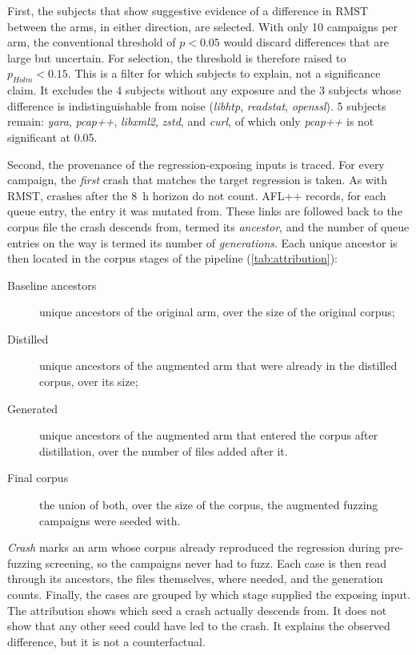 First, the subjects that show suggestive evidence of a difference in \ac{RMST} between the arms, in either direction, are selected.
With only \num{10} campaigns per arm, the conventional threshold of $p < \num{0.05}$ would discard differences that are large but uncertain.
For selection, the threshold is therefore raised to $p_{Holm} < \num{0.15}$.
This is a filter for which subjects to explain, not a significance claim.
It excludes the \num{4} subjects without any exposure and the \num{3} subjects whose difference is indistinguishable from noise (\emph{libhtp}, \emph{readstat}, \emph{openssl}).
\num{5} subjects remain: \emph{yara}, \emph{pcap++}, \emph{libxml2}, \emph{zstd}, and \emph{curl}, of which only \emph{pcap++} is not significant at \num{0.05}.

Second, the provenance of the regression-exposing inputs is traced.
For every campaign, the \emph{first} crash that matches the target regression is taken.
As with \ac{RMST}, crashes after the \SI{8}{\hour} horizon do not count.
AFL++ records, for each queue entry, the entry it was mutated from.
These links are followed back to the corpus file the crash descends from, termed its \emph{ancestor}, and the number of queue entries on the way is termed its number of \emph{generations}.
Each unique ancestor is then located in the corpus stages of the pipeline (\cref{tab:attribution}):
\begin{description}
  \item[Baseline ancestors] unique ancestors of the original arm, over the
    size of the original corpus;
  \item[Distilled] unique ancestors of the augmented arm that were already
    in the distilled corpus, over its size;
  \item[Generated] unique ancestors of the augmented arm that entered the
    corpus after distillation, over the number of files added after it.
  \item[Final corpus] the union of both, over the size of the corpus, the augmented fuzzing campaigns were seeded with.
\end{description}
\emph{Crash} marks an arm whose corpus already reproduced the regression during pre-fuzzing screening, so the campaigns never had to fuzz.
Each case is then read through its ancestors, the files themselves, where needed, and the generation counts.
Finally, the cases are grouped by which stage supplied the exposing input.
The attribution shows which seed a crash actually descends from.
It does not show that any other seed could have led to the crash.
It explains the observed difference, but it is not a counterfactual.

